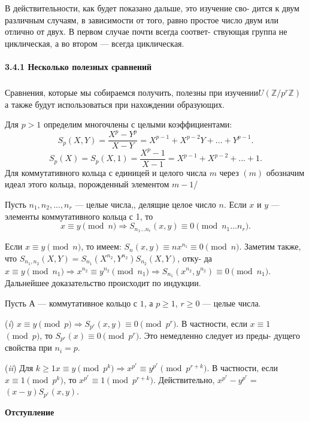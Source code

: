 В действительности, как будет показано дальше, это изучение сво-\linebreak­
дится к двум различным случаям, в зависимости от того, равно простое\linebreak
число двум или отлично от двух. В первом случае почти всегда соответ­-\linebreak
ствующая группа не циклическая, а во втором — всегда циклическая.\linebreak
\paragraph{3.4.1 Несколько полезных сравнений}
\subparagraph{}
Сравнения, которые мы собираемся получить, полезны при изучении\linebreak $U(\mathbb{Z}/p^r\mathbb{Z})$
а также будут использоваться при нахождении образующих.

Для $p>1$ определим многочлены с целыми коэффициентами:
$$S_p(X, Y) = \frac{X^p - Y^p}{X - Y}=X^{p-1}+X^{p-2}Y+...+Y^{p-1}.$$
$$S_p(X) = S_p(X, 1) = \frac{X^p - 1}{X - 1} = X^{p-1} + X^{p - 2} + ... + 1.$$
Для коммутативного кольца с единицей и целого числа $m$ через $(m)$\linebreak
обозначим идеал этого кольца, порожденный элементом $m - 1$/
\begin{property}
Пусть $n_1, n_2,...,n_r$ — целые числа,, делящие целое число $n$. Если $x$\linebreak
и $y$ — элементы коммутативного кольца с 1, то
$$x \equiv y\pmod{n}\Rightarrow S_{n_1...n_r}(x,y) \equiv 0 \pmod{n_1...n_r}.$$
\end{property}
\begin{myproof}
Если $x \equiv y \pmod{n}$, то имеем: $S_n(x, y) \equiv nx^{n _ 1} \equiv 0 \pmod {n}$.\linebreak
Заметим также, что $S_{n_1,n_2}(X,Y) = S_{n_1}(X^{n_2}, Y^{n_2})S_{n_2}(X,Y)$, отку-\linebreak­
да $x \equiv y \pmod{n_1} \Rightarrow x^{n_2} \equiv y^{n_2} \pmod{n_1} \Rightarrow S_{n_1}(x^{n_2},y^{n_2}) \equiv 0$\linebreak $\pmod{n_1}$. Дальнейшее доказательство происходит по индукции.
\end{myproof}
\begin{sled}
Пусть А --- коммутативное кольцо с $1$, а $p \ge 
1$, $r \ge 0$ — целые числа.
 
\par  (\textit{i}) $x \equiv y \pmod{p} \Rightarrow S_{p^r}(x,y) \equiv 0 \pmod{p^r}$. В частности, если $x \equiv 1$\linebreak
 $\pmod{p}$, то $S_{p^r}(x)\equiv 0 \pmod{p^r}$. Это немедленно следует из преды-\linebreak
дущего свойства при $n_i = p$.
\newpage
\par  (\textit{ii}) Для $k \ge 1 x \equiv y \pmod{p^k} \Rightarrow x^{p^r} \equiv y^{p^r} \pmod{p^{r+k}}$. В частности,\linebreak
если $x \equiv 1 \pmod{p^k}$, то $x^{p^r}\equiv 1 \pmod{p^{r+k}}$. Действительно, $x^{p^r} - y^{p^r} = $\linebreak$(x - y)S_{p^r}(x,y)$.
\end{sled}
\noindent\textbf{Отступление}

